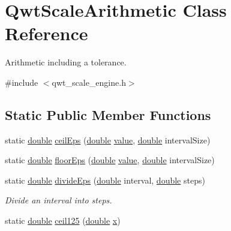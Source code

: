 \hypertarget{class_qwt_scale_arithmetic}{\section{Qwt\-Scale\-Arithmetic Class Reference}
\label{class_qwt_scale_arithmetic}
}


Arithmetic including a tolerance.  




{\ttfamily \#include $<$qwt\-\_\-scale\-\_\-engine.\-h$>$}

\subsection*{Static Public Member Functions}
\begin{DoxyCompactItemize}
\item 
static \hyperlink{_super_l_u_support_8h_a8956b2b9f49bf918deed98379d159ca7}{double} \hyperlink{class_qwt_scale_arithmetic_a86da4fc0928457d03201d8b520d7d816}{ceil\-Eps} (\hyperlink{_super_l_u_support_8h_a8956b2b9f49bf918deed98379d159ca7}{double} \hyperlink{glext_8h_aa0e2e9cea7f208d28acda0480144beb0}{value}, \hyperlink{_super_l_u_support_8h_a8956b2b9f49bf918deed98379d159ca7}{double} interval\-Size)
\item 
static \hyperlink{_super_l_u_support_8h_a8956b2b9f49bf918deed98379d159ca7}{double} \hyperlink{class_qwt_scale_arithmetic_a924d97f2e5db236f43f4d65e430e09c1}{floor\-Eps} (\hyperlink{_super_l_u_support_8h_a8956b2b9f49bf918deed98379d159ca7}{double} \hyperlink{glext_8h_aa0e2e9cea7f208d28acda0480144beb0}{value}, \hyperlink{_super_l_u_support_8h_a8956b2b9f49bf918deed98379d159ca7}{double} interval\-Size)
\item 
static \hyperlink{_super_l_u_support_8h_a8956b2b9f49bf918deed98379d159ca7}{double} \hyperlink{class_qwt_scale_arithmetic_ae5f0415105b2a97cccb93f3da9ddaead}{divide\-Eps} (\hyperlink{_super_l_u_support_8h_a8956b2b9f49bf918deed98379d159ca7}{double} interval, \hyperlink{_super_l_u_support_8h_a8956b2b9f49bf918deed98379d159ca7}{double} steps)
\begin{DoxyCompactList}\small\item\em Divide an interval into steps. \end{DoxyCompactList}\item 
static \hyperlink{_super_l_u_support_8h_a8956b2b9f49bf918deed98379d159ca7}{double} \hyperlink{class_qwt_scale_arithmetic_a5768ab1c30f4fa8f02e3bb83f50fac02}{ceil125} (\hyperlink{_super_l_u_support_8h_a8956b2b9f49bf918deed98379d159ca7}{double} \hyperlink{glext_8h_a1db9d104e3c2128177f26aff7b46982f}{x})

\end{DoxyCompactItemize}
